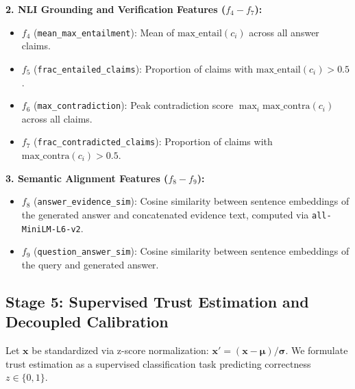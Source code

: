 \documentclass[journal,10pt]{IEEEtran}
\begin{document}
\textbf{2. NLI Grounding and Verification Features ($f_4 - f_7$):}
\begin{itemize}
    \item $f_4$ (\texttt{mean\_max\_entailment}): Mean of $\text{max\_entail}(c_i)$ across all answer claims.
    \item $f_5$ (\texttt{frac\_entailed\_claims}): Proportion of claims with $\text{max\_entail}(c_i) > 0.5$.
    \item $f_6$ (\texttt{max\_contradiction}): Peak contradiction score $\max_i \text{max\_contra}(c_i)$ across all claims.
    \item $f_7$ (\texttt{frac\_contradicted\_claims}): Proportion of claims with $\text{max\_contra}(c_i) > 0.5$.
\end{itemize}

\textbf{3. Semantic Alignment Features ($f_8 - f_9$):}
\begin{itemize}
    \item $f_8$ (\texttt{answer\_evidence\_sim}): Cosine similarity between sentence embeddings of the generated answer and concatenated evidence text, computed via \texttt{all-MiniLM-L6-v2}.
    \item $f_9$ (\texttt{question\_answer\_sim}): Cosine similarity between sentence embeddings of the query and generated answer.
\end{itemize}

\subsection{Stage 5: Supervised Trust Estimation and Decoupled Calibration}
Let $\mathbf{x}$ be standardized via z-score normalization: $\mathbf{x}' = (\mathbf{x} - \boldsymbol{\mu}) / \boldsymbol{\sigma}$. We formulate trust estimation as a supervised classification task predicting correctness $z \in \{0, 1\}$.
\end{document}
